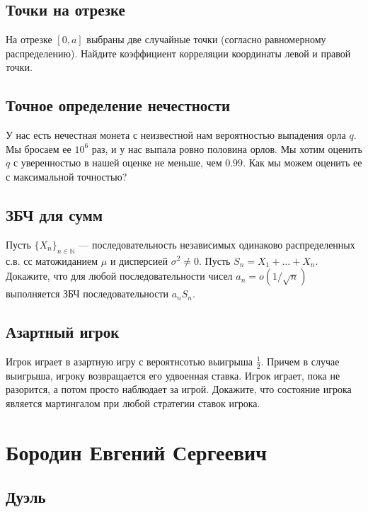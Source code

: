 \documentclass[12pt]{article}
\newcommand\N{\mathbb{N}}
\begin{document}
\subsection{Точки на отрезке}

На отрезке $[0, a]$ выбраны две случайные точки (согласно равномерному распределению). Найдите коэффициент корреляции координаты левой и правой точки. 



\subsection{Точное определение нечестности}

У нас есть нечестная монета с неизвестной нам вероятностью выпадения орла $q$. Мы бросаем ее $10^6$ раз, и у нас выпала ровно половина орлов. Мы хотим оценить $q$ с уверенностью в нашей оценке не меньше, чем $0.99$. Как мы можем оценить ее с максимальной точностью? 



\subsection{ЗБЧ для сумм}
Пусть $\{X_n\}_{n \in \N}$ --- последовательность независимых одинаково распределенных с.в. сс матожиданием $\mu$ и дисперсией $\sigma^2 \ne 0$. Пусть $S_n = X_1 + \dots + X_n$. Докажите, что для любой последовательности чисел $a_n = o(1/\sqrt{n})$ выполняется ЗБЧ последовательности $a_n S_n$.



\subsection{Азартный игрок}

Игрок играет в азартную игру с вероятнсотью выигрыша $\frac{1}{2}$. Причем в случае выигрыша, игроку возвращается его удвоенная ставка. Игрок играет, пока не разорится, а потом просто наблюдает за игрой. Докажите, что состояние игрока является мартингалом при любой стратегии ставок игрока.



\newpage
\section{Бородин Евгений Сергеевич}

\subsection{Дуэль}
\end{document}
